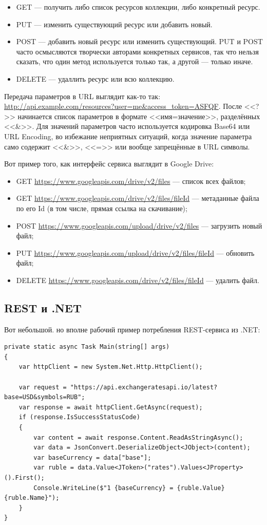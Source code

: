 \documentclass{../../text-style}
\begin{document}
\begin{itemize}
    \item GET --- получить либо список ресурсов коллекции, либо конкретный ресурс.
    \item PUT --- изменить существующий ресурс или добавить новый.
    \item POST --- добавить новый ресурс или изменить существующий. PUT и POST часто осмысляются творчески авторами конкретных сервисов, так что нельзя сказать, что один метод используется только так, а другой --- только иначе.
    \item DELETE --- удаллить ресурс или всю коллекцию.
\end{itemize}

Передача параметров в URL выглядит как-то так: \url{http://api.example.com/resources?user=me\&access\_token=ASFQF}. После <<?>> начинается список параметров в формате <<имя=значение>>, разделённых <<\&>>. Для значений параметров часто используется кодировка Base64 или URL Encoding, во избежание неприятных ситуаций, когда значение параметра само содержит <<\&>>, <<=>> или вообще запрещённые в URL символы.

Вот пример того, как интерфейс сервиса выглядит в Google Drive:

\begin{itemize}
    \item GET \url{https://www.googleapis.com/drive/v2/files} --- список всех файлов;
    \item GET \url{https://www.googleapis.com/drive/v2/files/fileId} --- метаданные файла по его Id (в том числе, прямая ссылка на скачивание);
    \item POST \url{https://www.googleapis.com/upload/drive/v2/files} — загрузить новый файл;
    \item PUT \url{https://www.googleapis.com/upload/drive/v2/files/fileId} --- обновить файл;
    \item DELETE \url{https://www.googleapis.com/drive/v2/files/fileId} --- удалить файл.
\end{itemize}

\subsection{REST и .NET}

Вот небольшой. но вполне рабочий пример потребления REST-сервиса из .NET:

\begin{verbatim}
private static async Task Main(string[] args)
{
    var httpClient = new System.Net.Http.HttpClient();

    var request = "https://api.exchangeratesapi.io/latest?base=USD&symbols=RUB";
    var response = await httpClient.GetAsync(request);
    if (response.IsSuccessStatusCode)
    {
        var content = await response.Content.ReadAsStringAsync();
        var data = JsonConvert.DeserializeObject<JObject>(content);
        var baseCurrency = data["base"];
        var ruble = data.Value<JToken>("rates").Values<JProperty>().First();
        Console.WriteLine($"1 {baseCurrency} = {ruble.Value} {ruble.Name}");
    }
}
\end{verbatim}
\end{document}
